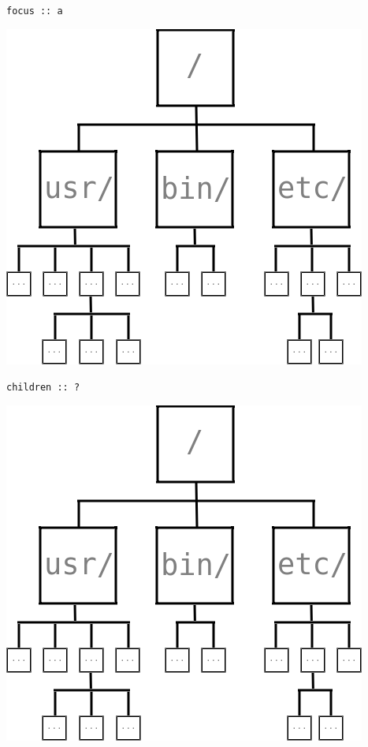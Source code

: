 \begin{frame}[fragile]
\begin{block}{\lstinline{focus :: a}}
\begin{center}
\includegraphics[width=0.60\textheight]{image/rosetree.png}
\end{center}
\end{block}
\end{frame}

\begin{frame}[fragile]
\begin{block}{\lstinline{children :: ?}}
\begin{center}
\includegraphics[width=0.60\textheight]{image/rosetree.png}
\end{center}
\end{block}
\end{frame}

